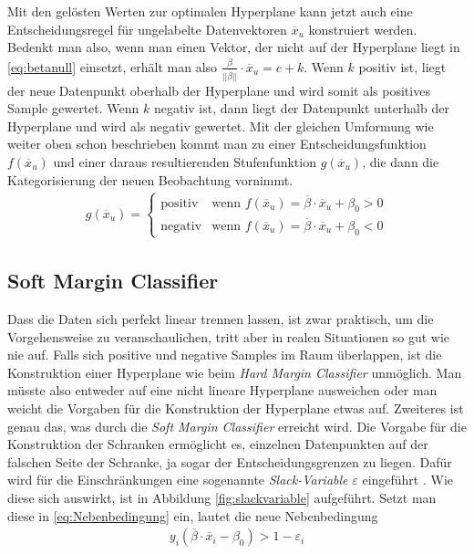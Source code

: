 \documentclass[
]{article}
\begin{document}
Mit den gelösten Werten zur optimalen Hyperplane kann jetzt auch eine
Entscheidungsregel für ungelabelte Datenvektoren \(\overline{x}_u\)
konstruiert werden. Bedenkt man also, wenn man einen Vektor, der nicht
auf der Hyperplane liegt in \eqref{eq:betanull} einsetzt, erhält man
also
\(\frac{\overline \beta}{||\overline{\beta}||}\cdot \overline{x}_u=c+k\).
Wenn \(k\) positiv ist, liegt der neue Datenpunkt oberhalb der
Hyperplane und wird somit als positives Sample gewertet. Wenn \(k\)
negativ ist, dann liegt der Datenpunkt unterhalb der Hyperplane und wird
als negativ gewertet. Mit der gleichen Umformung wie weiter oben schon
beschrieben kommt man zu einer Entscheidungsfunktion
\(f(\overline{x}_u)\) und einer daraus resultierenden Stufenfunktion
\(g(\overline{x}_u)\), die dann die Kategorisierung der neuen
Beobachtung vornimmt. \begin{align}
g(\overline{x}_u)=\begin{cases}\mathrm{positiv}&\text{wenn } f(\overline{x}_u)=\overline{\beta}\cdot \overline{x}_u+\beta_0 > 0\\
\mathrm{negativ} & \text{wenn }f(\overline{x}_u)=\overline{\beta}\cdot \overline{x}_u+\beta_0<0
\end{cases}\label{eq:decisionf}
\end{align}

\subsection{Soft Margin Classifier}

Dass die Daten sich perfekt linear trennen lassen, ist zwar praktisch,
um die Vorgehensweise zu veranschaulichen, tritt aber in realen
Situationen so gut wie nie auf. Falls sich positive und negative Samples
im Raum überlappen, ist die Konstruktion einer Hyperplane wie beim
\textit{Hard Margin Classifier} unmöglich. Man müsste also entweder auf
eine nicht lineare Hyperplane ausweichen oder man weicht die Vorgaben
für die Konstruktion der Hyperplane etwas auf. Zweiteres ist genau das,
was durch die \textit{Soft Margin Classifier} erreicht wird. Die Vorgabe
für die Konstruktion der Schranken ermöglicht es, einzelnen Datenpunkten
auf der falschen Seite der Schranke, ja sogar der Entscheidungsgrenzen
zu liegen. Dafür wird für die Einschränkungen eine sogenannte
\textit{Slack-Variable} \(\varepsilon\) eingeführt
\parencite{jamesIntroductionStatisticalLearning2021}. Wie diese sich
auswirkt, ist in Abbildung \ref{fig:slackvariable} aufgeführt. Setzt man
diese in \eqref{eq:Nebenbedingung} ein, lautet die neue Nebenbedingung
\begin{align}
y_i(\overline{\beta} \cdot \overline{x}_i-\beta_0)>1- \varepsilon_i \label{eq:nebbedsfm}
\end{align}
\end{document}
